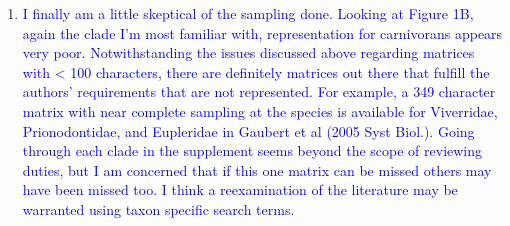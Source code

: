 \documentclass[12pt,letterpaper]{article}
\begin{document}
\begin{enumerate}



\item{\textcolor{blue}{I finally am a little skeptical of the sampling done. Looking at Figure 1B, again the clade I'm most familiar with, representation for carnivorans appears very poor. Notwithstanding the issues discussed above regarding matrices with < 100 characters, there are definitely matrices out there that fulfill the authors' requirements that are not represented. For example, a 349 character matrix with near complete sampling at the species is available for Viverridae, Prionodontidae, and Eupleridae in Gaubert et al (2005 Syst Biol.). Going through each clade in the supplement seems beyond the scope of reviewing duties, but I am concerned that if this one matrix can be missed others may have been missed too. I think a reexamination of the literature may be warranted using taxon specific search terms.}}



\end{enumerate}
\end{document}
